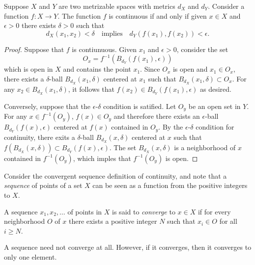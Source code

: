 \begin{theorem}
Suppose $X$ and $Y$ are two metrizable spaces with metrics $d_X$ and $d_Y$.
Consider a function $f : X \rightarrow Y$.
The function $f$ is continuous if and only if given $x \in X$ and $\epsilon > 0$ there exists $\delta > 0$ such that
\begin{equation*}
d_X(x_1, x_2) < \delta
\quad \text{implies} \quad
d_Y \left( f(x_1), f(x_2) \right) < \epsilon.
\end{equation*}
\end{theorem}
\begin{proof}
Suppose that $f$ is contiunuous.
Given $x_1$ and $\epsilon > 0$, consider the set
\begin{equation*}
O_x = f^{-1} \left( B_{d_Y} (f(x_1), \epsilon) \right)
\end{equation*}
which is open in $X$ and contains the point $x_1$.
Since $O_x$ is open and $x_1 \in O_x$, there exists a $\delta$-ball $B_{d_X} (x_1, \delta)$ centered at $x_1$ such that $B_{d_X} (x_1, \delta) \subset O_x$.
For any $x_2 \in B_{d_X} (x_1, \delta)$, it follows that $f(x_2) \in B_{d_Y} (f(x_1), \epsilon)$ as desired.

Conversely, suppose that the $\epsilon$-$\delta$ condition is satified.
Let $O_y$ be an open set in $Y$.
For any $x \in f^{-1} (O_y)$, $f(x) \in O_y$ and therefore there exists an $\epsilon$-ball $B_{d_Y} (f(x), \epsilon)$ centered at $f(x)$ contained in $O_y$.
By the $\epsilon$-$\delta$ condition for continuity, there exits a $\delta$-ball $B_{d_X} (x, \delta)$ centered at $x$ such that $f \left( B_{d_X} (x,\delta) \right) \subset B_{d_Y} \left( f(x), \epsilon \right)$.
The set $B_{d_X} (x, \delta)$ is a neighborhood of $x$ contained in $f^{-1} (O_y)$, which imples that $f^{-1} (O_y)$ is open.
\end{proof}

Consider the convergent sequence definition of continuity, and note that a \emph{sequence} of points of a set $X$ can be seen as a function from the positive integers to $X$.

\begin{definition} \label{definition:SequenceConvergence}
A sequence $x_1, x_2, \ldots$ of points in $X$ is said to \emph{converge} to $x \in X$ if for every neighborhood $O$ of $x$ there exists a positive integer $N$ such that $x_i \in O$ for all $i \geq N$.
\end{definition}

A sequence need not converge at all.
However, if it converges, then it converges to only one element.

